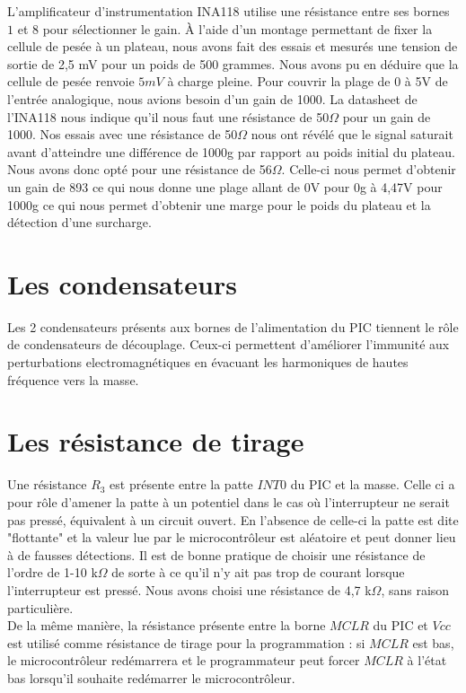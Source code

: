 \documentclass[a4paper,11pt,titlepage]{article}
\begin{document}
L'amplificateur d'instrumentation INA118 utilise une résistance entre ses bornes $1$ et $8$ pour sélectionner le gain. À l'aide d'un montage permettant de fixer la cellule de pesée à un plateau, nous avons fait des essais et mesurés une tension de sortie de 2,5 mV pour un poids de 500 grammes. Nous avons pu en déduire que la cellule de pesée renvoie $5mV$ à charge pleine. Pour couvrir la plage de 0 à 5V de l'entrée analogique, nous avions besoin d'un gain de 1000. La datasheet de l'INA118 nous indique qu'il nous faut une résistance de 50$\Omega$ pour un gain de 1000. Nos essais avec une résistance de 50$\Omega$ nous ont révélé que le signal saturait avant d'atteindre une différence de 1000g par rapport au poids initial du plateau. Nous avons donc opté pour une résistance de 56$\Omega$. Celle-ci nous permet d'obtenir un gain de 893 ce qui nous donne une plage allant de 0V pour 0g à 4,47V pour 1000g ce qui nous permet d'obtenir une marge pour le poids du plateau et la détection d'une surcharge.

\section{Les condensateurs}

Les 2 condensateurs présents aux bornes de l'alimentation du PIC tiennent le rôle de condensateurs de découplage. Ceux-ci permettent d'améliorer l'immunité aux perturbations electromagnétiques en évacuant les harmoniques de hautes fréquence vers la masse.

\section{Les résistance de tirage}

Une résistance $R_3$ est présente entre la patte $INT0$ du PIC et la masse. Celle ci a pour rôle d'amener la patte à un potentiel dans le cas où l'interrupteur ne serait pas pressé, équivalent à un circuit ouvert. En l'absence de celle-ci la patte est dite "flottante" et la valeur lue par le microcontrôleur est aléatoire et peut donner lieu à de fausses détections. Il est de bonne pratique de choisir une résistance de l'ordre de 1-10 k$\Omega$ de sorte à ce qu'il n'y ait pas trop de courant lorsque l'interrupteur est pressé. Nous avons choisi une résistance de 4,7 k$\Omega$, sans raison particulière.\\

De la même manière, la résistance présente entre la borne $MCLR$ du PIC et $Vcc$ est utilisé comme résistance de tirage pour la programmation : si $MCLR$ est bas, le microcontrôleur redémarrera et le programmateur peut forcer $MCLR$ à l'état bas lorsqu'il souhaite redémarrer le microcontrôleur.
\end{document}
